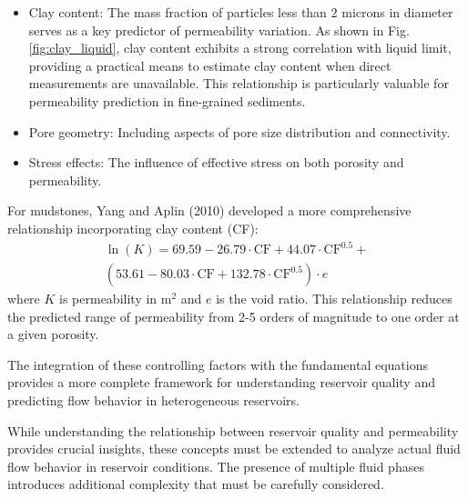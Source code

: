 \documentclass[journal]{IEEEtran}
\begin{document}
\begin{itemize}
    \item Clay content: The mass fraction of particles less than 2 microns in diameter serves as a key predictor of permeability variation. As shown in Fig. \ref{fig:clay_liquid}, clay content exhibits a strong correlation with liquid limit, providing a practical means to estimate clay content when direct measurements are unavailable. This relationship is particularly valuable for permeability prediction in fine-grained sediments.
    \item Pore geometry: Including aspects of pore size distribution and connectivity.
    \item Stress effects: The influence of effective stress on both porosity and permeability.
\end{itemize}

For mudstones, Yang and Aplin (2010)\parencite{yang_permeabilityporosity_2010} developed a more comprehensive relationship incorporating clay content (CF):
\begin{align}
\ln(K) = 69.59 - 26.79\cdot\text{CF} + 44.07\cdot\text{CF}^{0.5} + \nonumber\\
(53.61 - 80.03\cdot\text{CF} + 132.78\cdot\text{CF}^{0.5})\cdot e
\end{align}
\noindent where $K$ is permeability in m$^2$ and $e$ is the void ratio. This relationship reduces the predicted range of permeability from 2-5 orders of magnitude to one order at a given porosity.

The integration of these controlling factors with the fundamental equations provides a more complete framework for understanding reservoir quality and predicting flow behavior in heterogeneous reservoirs.

While understanding the relationship between reservoir quality and permeability provides crucial insights, these concepts must be extended to analyze actual fluid flow behavior in reservoir conditions. The presence of multiple fluid phases introduces additional complexity that must be carefully considered.
\end{document}
